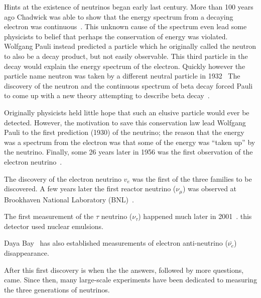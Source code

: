Hints at the existence of neutrinos began early last century.
More than 100 years ago Chadwick was able to show that the energy spectrum from a decaying electron was continuous~\citep{Chadwick:1914zz}.
This unknown cause of the spectrum even lead some physicists to belief that perhaps the conservation of energy was violated.
Wolfgang Pauli instead predicted a particle which he originally called the neutron to also be a decay product, but not easily observable.
This third particle in the decay would explain the energy spectrum of the electron.
Quickly however the particle name neutron was taken by a different neutral particle in 1932~\citep{Chadwick1932PossibleEO}
The discovery of the neutron and the continuous spectrum of beta decay forced Pauli to come up with a new theory attempting to describe beta decay~\citep{pauli_1934}.

Originally physicists held little hope that such an elusive particle would ever be detected.
However, the motivation to save this conservation law lead Wolfgang Pauli to the first prediction (1930) of the neutrino; the reason that the energy was a spectrum from the electron was that some of the energy was ``taken up'' by the neutrino.
Finally, some 26 years later in 1956 was the first observation of the electron neutrino~\citep{first_neutrino_measurement}.

The discovery of the electron neutrino $v_{e}$ was the first of the three families to be discovered.
A few years later the first reactor neutrino ($\nu_{\mu}$) was observed at Brookhaven National Laboratory (BNL)~\citep{PhysRevLett.9.36}.

The first measurement of the $\tau$ neutrino ($\nu_{\tau}$) happened much later in 2001~\citep{tau_neutrino_discovery_KODAMA2001218}.
this detector used nuclear emulsions.

Daya Bay~\citep{daya_bay_2012_neutrino_PhysRevLett.108.171803} has also established measurements of electron anti-neutrino ($\bar{\nu_{e}}$) disappearance.

After this first discovery is when the the answers, followed by more questions, came.
Since then, many large-scale experiments have been dedicated to measuring the three generations of neutrinos.
~\citep{SNO_2002_neutrino_PhysRevLett.89.011301,
neutrino_measurement_NOvA_2019_prl,
t2k_2011_neutrino_PhysRevLett.107.041801,
reno_2012_neutrino_PhysRevLett.108.191802,
FUKUDA2002_solar_neutrino_oscillation,
kamland_2003_neutrino_PhysRevLett.90.021802,
daya_bay_2012_neutrino_PhysRevLett.108.171803,
doubleChooz_2012_neutrino_PhysRevLett.108.131801}

